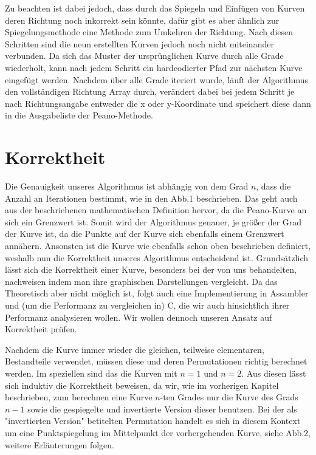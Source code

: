 \documentclass[course=asp]{aspdoc}
\begin{document}
Zu beachten ist dabei jedoch, dass durch das Spiegeln und Einfügen von Kurven deren Richtung noch inkorrekt sein könnte, dafür gibt es aber ähnlich zur Spiegelungsmethode eine Methode zum Umkehren der Richtung. Nach diesen Schritten sind die neun erstellten Kurven jedoch noch nicht miteinander verbunden. Da sich das Muster der ursprünglichen Kurve durch alle Grade wiederholt, kann nach jedem Schritt ein hardcodierter Pfad zur nächsten Kurve eingefügt werden.
Nachdem über alle Grade iteriert wurde, läuft der Algorithmus den vollständigen Richtung Array durch, verändert dabei bei jedem Schritt je nach Richtungsangabe entweder die x oder y-Koordinate und speichert diese dann in die Ausgabeliste der Peano-Methode.

\newpage

\section{Korrektheit} %

Die Genauigkeit unseres Algorithmus ist abhängig von dem Grad $n$, dass die Anzahl an Iterationen bestimmt, wie in den Abb.1 beschrieben. Das geht auch aus der beschriebenen mathematischen Definition hervor, da die Peano-Kurve an sich ein Grenzwert ist. Somit wird der Algorithmus genauer, je größer der Grad der Kurve ist, da die Punkte auf der Kurve sich ebenfalls einem Grenzwert annähern. Ansonsten ist die Kurve wie ebenfalls schon oben beschrieben definiert, weshalb nun die Korrektheit unseres Algorithmus entscheidend ist.
Grundsätzlich lässt sich die Korrektheit einer Kurve, besonders bei der von uns behandelten, nachweisen indem man ihre graphischen Darstellungen vergleicht. Da das Theoretisch aber nicht möglich ist, folgt auch eine Implementierung in Assambler und (um die Performanz zu vergleichen in) C, die wir auch hinsichtlich ihrer Performanz analysieren wollen.
Wir wollen dennoch unseren Ansatz auf Korrektheit prüfen.


Nachdem die Kurve immer wieder die gleichen, teilweise elementaren, Bestandteile verwendet, müssen diese und deren Permutationen richtig berechnet werden. Im speziellen sind das die Kurven mit $n = 1$ und $n = 2$. Aus diesen lässt sich induktiv die Korrektheit beweisen, da wir, wie im vorherigen Kapitel beschrieben, zum berechnen eine Kurve $n$-ten Grades nur die Kurve des Grads $n - 1$ sowie die gespiegelte und invertierte Version dieser benutzen. Bei der als "invertierten Version" betitelten Permutation handelt es sich in diesem Kontext um eine Punktspiegelung im Mittelpunkt der vorhergehenden Kurve, siehe Abb.2, weitere Erläuterungen folgen.	%
\end{document}
